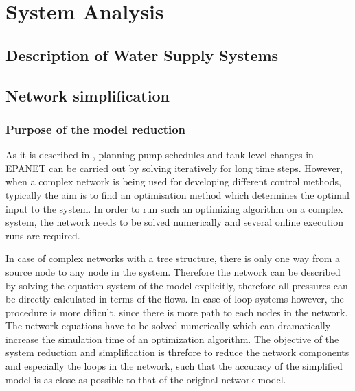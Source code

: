 
\part{System Analysis}
\label{system_analysis}

\chapter{Description of Water Supply Systems}
\label{description_of_water_supply_systems}

 





\chapter{Network simplification}
\label{network_simplification}

\section{Purpose of the model reduction}
\label{purpose_of_the_model_reduction}

As it is described in , planning pump schedules and tank level changes in EPANET can be carried out by solving iteratively for long time steps. However, when a complex network is being used for developing different control methods, typically the aim is to find an optimisation method which determines the optimal input to the system. In order to run such an optimizing algorithm on a complex system, the network needs to be solved numerically and several online execution runs are required. 

In case of complex networks with a tree structure, there is only one way from a source node to any node in the system. Therefore the network can be described by solving the equation system of the model explicitly, therefore all pressures can be directly calculated in terms of the flows. In case of loop systems however, the procedure is more dificult, since there is more path to each nodes in the network. The network equations have to be solved numerically which can dramatically increase the simulation time of an optimization algorithm. The objective of the system reduction and simplification is threfore to reduce the network components and especially the loops in the network, such that the accuracy of the simplified model is as close as possible to that of the original network model. 

